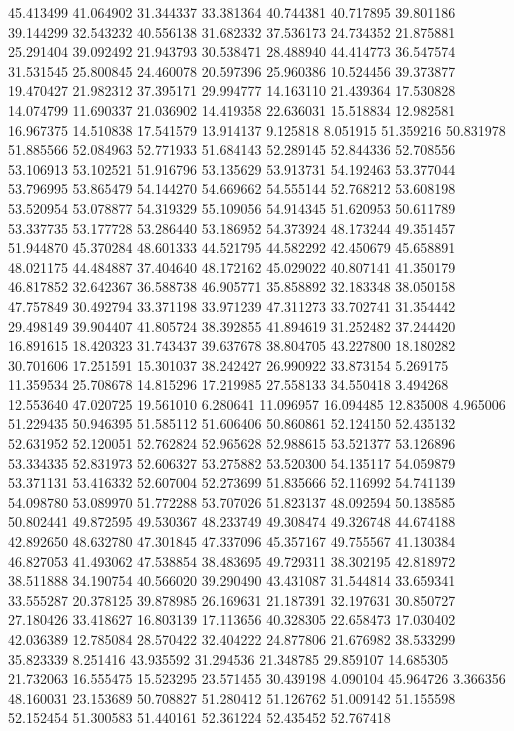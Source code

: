 45.413499
41.064902
31.344337
33.381364
40.744381
40.717895
39.801186
39.144299
32.543232
40.556138
31.682332
37.536173
24.734352
21.875881
25.291404
39.092492
21.943793
30.538471
28.488940
44.414773
36.547574
31.531545
25.800845
24.460078
20.597396
25.960386
10.524456
39.373877
19.470427
21.982312
37.395171
29.994777
14.163110
21.439364
17.530828
14.074799
11.690337
21.036902
14.419358
22.636031
15.518834
12.982581
16.967375
14.510838
17.541579
13.914137
9.125818
8.051915
51.359216
50.831978
51.885566
52.084963
52.771933
51.684143
52.289145
52.844336
52.708556
53.106913
53.102521
51.916796
53.135629
53.913731
54.192463
53.377044
53.796995
53.865479
54.144270
54.669662
54.555144
52.768212
53.608198
53.520954
53.078877
54.319329
55.109056
54.914345
51.620953
50.611789
53.337735
53.177728
53.286440
53.186952
54.373924
48.173244
49.351457
51.944870
45.370284
48.601333
44.521795
44.582292
42.450679
45.658891
48.021175
44.484887
37.404640
48.172162
45.029022
40.807141
41.350179
46.817852
32.642367
36.588738
46.905771
35.858892
32.183348
38.050158
47.757849
30.492794
33.371198
33.971239
47.311273
33.702741
31.354442
29.498149
39.904407
41.805724
38.392855
41.894619
31.252482
37.244420
16.891615
18.420323
31.743437
39.637678
38.804705
43.227800
18.180282
30.701606
17.251591
15.301037
38.242427
26.990922
33.873154
5.269175
11.359534
25.708678
14.815296
17.219985
27.558133
34.550418
3.494268
12.553640
47.020725
19.561010
6.280641
11.096957
16.094485
12.835008
4.965006
51.229435
50.946395
51.585112
51.606406
50.860861
52.124150
52.435132
52.631952
52.120051
52.762824
52.965628
52.988615
53.521377
53.126896
53.334335
52.831973
52.606327
53.275882
53.520300
54.135117
54.059879
53.371131
53.416332
52.607004
52.273699
51.835666
52.116992
54.741139
54.098780
53.089970
51.772288
53.707026
51.823137
48.092594
50.138585
50.802441
49.872595
49.530367
48.233749
49.308474
49.326748
44.674188
42.892650
48.632780
47.301845
47.337096
45.357167
49.755567
41.130384
46.827053
41.493062
47.538854
38.483695
49.729311
38.302195
42.818972
38.511888
34.190754
40.566020
39.290490
43.431087
31.544814
33.659341
33.555287
20.378125
39.878985
26.169631
21.187391
32.197631
30.850727
27.180426
33.418627
16.803139
17.113656
40.328305
22.658473
17.030402
42.036389
12.785084
28.570422
32.404222
24.877806
21.676982
38.533299
35.823339
8.251416
43.935592
31.294536
21.348785
29.859107
14.685305
21.732063
16.555475
15.523295
23.571455
30.439198
4.090104
45.964726
3.366356
48.160031
23.153689
50.708827
51.280412
51.126762
51.009142
51.155598
52.152454
51.300583
51.440161
52.361224
52.435452
52.767418
